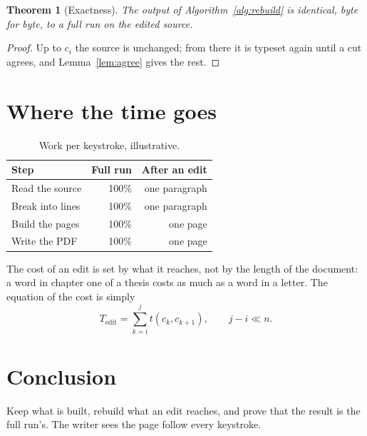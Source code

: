 \documentclass[10pt,twocolumn]{article}
\newtheorem{theorem}{Theorem}
\theoremstyle{definition}
\begin{document}
\begin{theorem}[Exactness]
\label{thm:exact}
The output of Algorithm~\ref{alg:rebuild} is identical, byte for byte, to a
full run on the edited source.
\end{theorem}
\begin{proof}
Up to $c_i$ the source is unchanged; from there it is typeset again until a
cut agrees, and Lemma~\ref{lem:agree} gives the rest.
\end{proof}

\section{Where the time goes}
\label{sec:cost}
\begin{table}[h]
\centering
\caption{Work per keystroke, illustrative.}
\label{tab:cost}
\begin{tabular}{@{}lrr@{}}
\toprule
Step & Full run & After an edit \\
\midrule
Read the source   & 100\% & one paragraph \\
Break into lines  & 100\% & one paragraph \\
Build the pages   & 100\% & one page \\
Write the PDF     & 100\% & one page \\
\bottomrule
\end{tabular}
\end{table}
The cost of an edit is set by what it reaches, not by the length of the
document: a word in chapter one of a thesis costs as much as a word in a
letter. The equation of the cost is simply
\begin{equation}
  T_{\text{edit}} = \sum_{k=i}^{j} t(c_k, c_{k+1}), \qquad j - i \ll n.
\end{equation}

\section{Conclusion}
Keep what is built, rebuild what an edit reaches, and prove that the result is
the full run's. The writer sees the page follow every keystroke.



\end{document}
